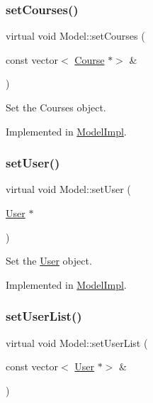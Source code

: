 \mbox{\label{classModel_a9a4cc2b97cd97bc987f019dca7aa5d9e}} 
\subsubsection{\texorpdfstring{set\+Courses()}{setCourses()}}
{\footnotesize\ttfamily virtual void Model\+::set\+Courses (\begin{DoxyParamCaption}\item[{const vector$<$ \hyperlink{classCourse}{Course} $\ast$$>$ \&}]{ }\end{DoxyParamCaption})\hspace{0.3cm}{\ttfamily [pure virtual]}}



Set the Courses object. 



Implemented in \hyperlink{classModelImpl_ae90d5e4e7ec786f3752a6551dab39d66}{Model\+Impl}.

\mbox{\label{classModel_aae120afc85d42a7bedee5405911986a5}} 
\subsubsection{\texorpdfstring{set\+User()}{setUser()}}
{\footnotesize\ttfamily virtual void Model\+::set\+User (\begin{DoxyParamCaption}\item[{\hyperlink{classUser}{User} $\ast$}]{ }\end{DoxyParamCaption})\hspace{0.3cm}{\ttfamily [pure virtual]}}



Set the \hyperlink{classUser}{User} object. 



Implemented in \hyperlink{classModelImpl_a9e1a1953a4d3355e147515c2a0b3c031}{Model\+Impl}.

\mbox{\label{classModel_affa0ad47e9417b52eca3b73105bad9f0}} 
\subsubsection{\texorpdfstring{set\+User\+List()}{setUserList()}}
{\footnotesize\ttfamily virtual void Model\+::set\+User\+List (\begin{DoxyParamCaption}\item[{const vector$<$ \hyperlink{classUser}{User} $\ast$$>$ \&}]{ }\end{DoxyParamCaption})\hspace{0.3cm}{\ttfamily [pure virtual]}}



